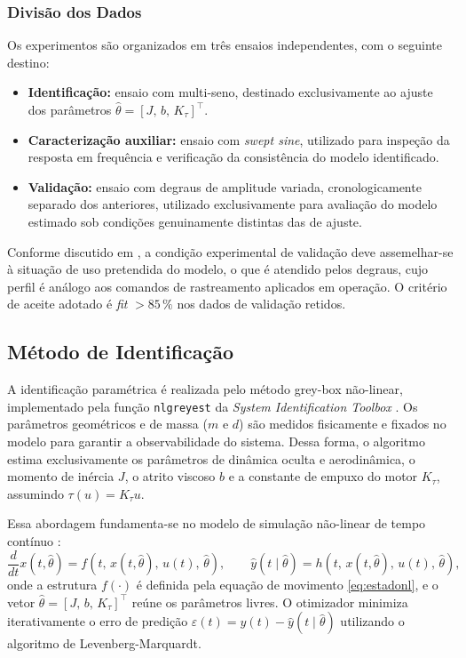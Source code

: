 \subsubsection{Divisão dos Dados}
\label{subsec:divisao_dados}

Os experimentos são organizados em três ensaios independentes, com o seguinte destino:

\begin{itemize}
    \item \textbf{Identificação:} ensaio com multi-seno, destinado exclusivamente ao ajuste dos parâmetros $\hat{\theta} = [J,\,b,\,K_\tau]^\top$.

    \item \textbf{Caracterização auxiliar:} ensaio com \textit{swept sine}, utilizado para inspeção da resposta em frequência e verificação da consistência do modelo identificado.

    \item \textbf{Validação:} ensaio com degraus de amplitude variada, cronologicamente separado dos anteriores, utilizado exclusivamente para avaliação do modelo estimado sob condições genuinamente distintas das de ajuste.
\end{itemize}

Conforme discutido em , a condição experimental de validação deve assemelhar-se à situação de uso pretendida do modelo, o que é atendido pelos degraus, cujo perfil é análogo aos comandos de rastreamento aplicados em operação. O critério de aceite adotado é \textit{fit} $> 85\,\%$ nos dados de validação retidos.

\subsection{Método de Identificação}

A identificação paramétrica é realizada pelo método grey-box não-linear, implementado pela função \texttt{nlgreyest} da \textit{System Identification Toolbox} \cite{mathworks_nlgreyest}. Os parâmetros geométricos e de massa ($m$ e $d$) são medidos fisicamente e fixados no modelo para garantir a observabilidade do sistema. Dessa forma, o algoritmo estima exclusivamente os parâmetros de dinâmica oculta e aerodinâmica, o momento de inércia $J$, o atrito viscoso $b$ e a constante de empuxo do motor $K_\tau$, assumindo $\tau(u) = K_\tau u$.

Essa abordagem fundamenta-se no modelo de simulação não-linear de tempo contínuo \cite{ljung1999}:
\begin{equation}
    \frac{d}{dt}x(t,\hat{\theta}) = f\!\left(t,\, x(t,\hat{\theta}),\, u(t),\, \hat{\theta}\right), \qquad
    \hat{y}(t\mid\hat{\theta}) = h\!\left(t,\, x(t,\hat{\theta}),\, u(t),\, \hat{\theta}\right),
    \label{eq:ljung_sim}
\end{equation}
\noindent onde a estrutura $f(\cdot)$ é definida pela equação de movimento \eqref{eq:estadonl}, e o vetor $\hat{\theta} = [J,\, b,\, K_\tau]^\top$ reúne os parâmetros livres. O otimizador minimiza iterativamente o erro de predição $\varepsilon(t) = y(t) - \hat{y}(t\mid\hat{\theta})$ utilizando o algoritmo de Levenberg-Marquardt.

